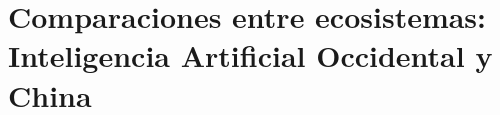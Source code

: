 
\providecommand{\mathbb}[1]{\mathbf{#1}}
\providecommand{\text}[1]{\mbox{#1}}
\providecommand{\binom}[2]{{{#1 \choose #2}}}

\section[Comparaciones entre ecosistemas]{Comparaciones entre ecosistemas: Inteligencia Artificial Occidental y China}


